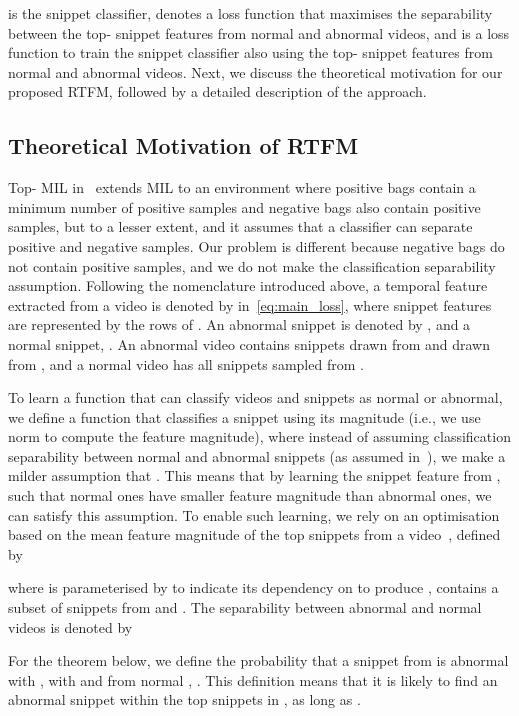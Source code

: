 \documentclass[10pt,twocolumn,letterpaper]{article}
\begin{document}
is the snippet classifier, 
 denotes a loss function 
that maximises the separability between the top- snippet features from normal and abnormal videos, and  is a loss function to train the snippet classifier  also using the top- snippet features from normal and abnormal videos. 
Next, we discuss the theoretical motivation for our proposed RTFM, followed by a detailed description of the approach. 





\subsection{Theoretical Motivation of RTFM}
\label{sec:theory_RTFM}


Top- MIL in~\cite{li2015multiple} extends MIL to an environment where positive bags contain a minimum number of positive samples and negative bags also contain positive samples, but to a lesser extent, and it assumes that a classifier can separate positive and negative samples.
Our problem is different because negative bags do not contain positive samples, and we do not make the classification separability assumption.
Following the nomenclature introduced above, a temporal feature extracted from a video is denoted by  in~\eqref{eq:main_loss}, where snippet features are represented by the rows  of .
An abnormal snippet is denoted by , and a normal snippet, .
An abnormal video  contains  snippets drawn from  and  drawn from , and a normal video  has all  snippets sampled from . 

To learn a function that can classify videos and snippets as normal or abnormal, we define a function that classifies a snippet using its magnitude (i.e., we use  norm to compute the feature magnitude),
where instead of assuming classification separability between normal and abnormal snippets (as assumed in~\cite{li2015multiple}), we make a milder assumption that 
.  
This means that by learning the snippet feature from , such that normal ones have smaller feature magnitude than abnormal ones, we can satisfy this assumption. To enable such learning, we rely on an optimisation based on the mean feature magnitude of the top  snippets from a video~\cite{li2015multiple}, 
defined by 

where  is parameterised by  to indicate its dependency on  to produce ,
 contains a subset of  snippets from  and . The separability between abnormal and normal videos is denoted by

For the theorem below, we define the probability that a snippet from  is abnormal with , with  and from normal  , .  This definition means that it is likely to find an abnormal snippet within the top  snippets in , as long as .
\end{document}
